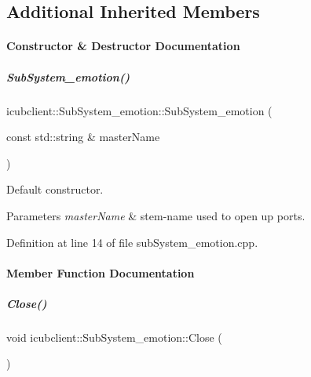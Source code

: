 \subsection*{Additional Inherited Members}


\paragraph{Constructor \& Destructor Documentation}
\mbox{\label{group__icubclient__subsystems_aa5edf05eb54ad2fe7d8068c8336d902f}} 
\subparagraph{\texorpdfstring{Sub\+System\+\_\+emotion()}{SubSystem\_emotion()}}
{\footnotesize\ttfamily icubclient\+::\+Sub\+System\+\_\+emotion\+::\+Sub\+System\+\_\+emotion (\begin{DoxyParamCaption}\item[{const std\+::string \&}]{master\+Name }\end{DoxyParamCaption})}



Default constructor. 


\begin{DoxyParams}{Parameters}
{\em master\+Name} & stem-\/name used to open up ports. \\
\hline
\end{DoxyParams}


Definition at line 14 of file sub\+System\+\_\+emotion.\+cpp.



\paragraph{Member Function Documentation}
\mbox{\label{group__icubclient__subsystems_a44727eb284e1291c193559d9ecc12a50}} 
\subparagraph{\texorpdfstring{Close()}{Close()}}
{\footnotesize\ttfamily void icubclient\+::\+Sub\+System\+\_\+emotion\+::\+Close (\begin{DoxyParamCaption}{ }\end{DoxyParamCaption})\hspace{0.3cm}{\ttfamily [virtual]}}



